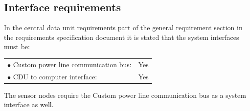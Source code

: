 \subsection{Interface requirements}
In the central data unit requirements part of the general requirement section in the requirements specification document it is stated that the system interfaces must be:
\begin{table}[H]
	\begin{tabular}{p{8cm} p{2cm}}
	$\bullet$ Custom power line communication bus: & Yes\\
	$\bullet$ CDU to computer interface: & Yes\\
	\end{tabular}
\end{table}
The sensor nodes require the Custom power line communication bus as a system interface as well.
